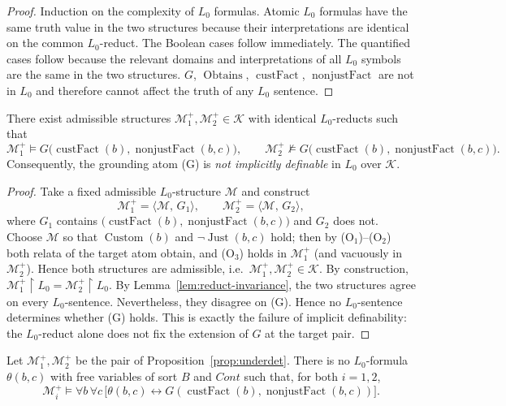 \begin{proof}
Induction on the complexity of $L_0$ formulas. Atomic $L_0$ formulas
have the same truth value in the two structures because their
interpretations are identical on the common $L_0$-reduct. The
Boolean cases follow immediately. The quantified cases follow because
the relevant domains and interpretations of all $L_0$ symbols are the
same in the two structures. $G$, $\operatorname{Obtains}$,
$\operatorname{custFact}$, $\operatorname{nonjustFact}$ are not in
$L_0$ and therefore cannot affect the truth of any $L_0$ sentence.
\end{proof}

\begin{proposition}
\label{prop:underdet}
There exist admissible structures $\mathcal M_1^+,\mathcal M_2^+\in\mathcal K$
with identical $L_0$-reducts such that
\[
\mathcal M_1^+\models
G\bigl(\operatorname{custFact}(b),\operatorname{nonjustFact}(b,c)\bigr),
\qquad
\mathcal M_2^+\not\models
G\bigl(\operatorname{custFact}(b),\operatorname{nonjustFact}(b,c)\bigr).
\]
Consequently, the grounding atom (G) is \emph{not implicitly
definable} in $L_0$ over $\mathcal K$.
\end{proposition}

\begin{proof}
Take a fixed admissible $L_0$-structure $\mathcal M$ and construct
\[
\mathcal M_1^+=\langle\mathcal M,\,G_1\rangle,\qquad
\mathcal M_2^+=\langle\mathcal M,\,G_2\rangle,
\]
where $G_1$ contains
$\bigl(\operatorname{custFact}(b),\operatorname{nonjustFact}(b,c)\bigr)$
and $G_2$ does not. Choose $\mathcal M$ so that
$\operatorname{Custom}(b)$ and $\neg\operatorname{Just}(b,c)$ hold; then by
(O$_1$)--(O$_2$) both relata of the target atom obtain, and (O$_3$) holds in
$\mathcal M_1^+$ (and vacuously in $\mathcal M_2^+$). Hence both structures
are admissible, i.e.\ $\mathcal M_1^+,\mathcal M_2^+\in\mathcal K$. By
construction,
$\mathcal M_1^+\!\upharpoonright L_0
 =\mathcal M_2^+\!\upharpoonright L_0$.
By Lemma~\ref{lem:reduct-invariance}, the two structures agree on
every $L_0$-sentence. Nevertheless, they disagree on (G). Hence no
$L_0$-sentence determines whether (G) holds. This is exactly the
failure of implicit definability: the $L_0$-reduct alone does not
fix the extension of $G$ at the target pair.
\end{proof}

\begin{proposition}
\label{prop:definability}
Let $\mathcal M_1^+,\mathcal M_2^+$ be the pair of
Proposition~\ref{prop:underdet}. There is no $L_0$-formula
$\theta(b,c)$ with free variables of sort $B$ and $\mathit{Cont}$ such
that, for both $i=1,2$,
\[
\mathcal M_i^+\models
\forall b\,\forall c\,
\bigl[
\theta(b,c)\leftrightarrow
G(\operatorname{custFact}(b),\operatorname{nonjustFact}(b,c))
\bigr].
\]
\end{proposition}

